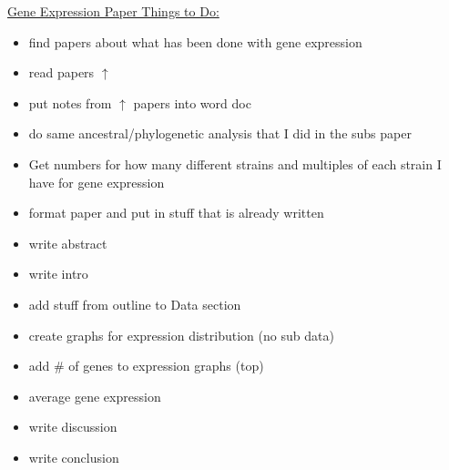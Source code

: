 \documentclass[12pt]{article}
\begin{document}
\underline{Gene Expression Paper Things to Do:}
\begin{itemize}
	\item find papers about what has been done with gene expression
	
	\item read papers $\uparrow$
	
	\item put notes from $\uparrow$ papers into word doc
	
	\item do same ancestral/phylogenetic analysis that I did in the subs paper 
	
	\item Get numbers for how many different strains and multiples of each strain I have for gene expression
	
	\item format paper and put in stuff that is already written
	
	\item write abstract
	
	\item write intro
	
	\item add stuff from outline to Data section
	
	\item create graphs for expression distribution (no sub data)
	
	\item add \# of genes to expression graphs (top)
	
	\item average gene expression
	
	\item write discussion
	
	\item write conclusion
\end{itemize}
\end{document}
